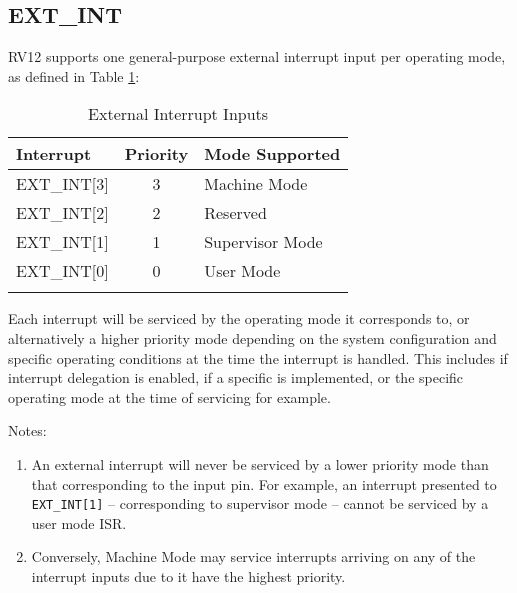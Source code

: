 \subsection{EXT\_INT}\label{ext_int}

RV12 supports one general-purpose external interrupt input per operating
mode, as defined in Table \ref{tab:external-interrupt-inputs}:

\begin{longtable}[]{@{}lcl@{}}
\toprule
Interrupt & Priority & Mode Supported\tabularnewline
\midrule
\endhead
EXT\_INT{[}3{]} & 3 & Machine Mode\tabularnewline
EXT\_INT{[}2{]} & 2 & Reserved\tabularnewline
EXT\_INT{[}1{]} & 1 & Supervisor Mode\tabularnewline
EXT\_INT{[}0{]} & 0 & User Mode\tabularnewline
\bottomrule
\caption{External Interrupt Inputs}
\label{tab:external-interrupt-inputs}
\end{longtable}

Each interrupt will be serviced by the operating mode it corresponds to,
or alternatively a higher priority mode depending on the system
configuration and specific operating conditions at the time the
interrupt is handled. This includes if interrupt delegation is enabled,
if a specific is implemented, or the specific operating mode at the time
of servicing for example.

Notes:

\begin{enumerate}
\def\labelenumi{\arabic{enumi}.}
\item
  An external interrupt will never be serviced by a lower priority mode
  than that corresponding to the input pin. For example, an interrupt
  presented to \texttt{EXT\_INT{[}1{]}} -- corresponding to supervisor mode --
  cannot be serviced by a user mode ISR.
\item
  Conversely, Machine Mode may service interrupts arriving on any of the
  interrupt inputs due to it have the highest priority.
\end{enumerate}